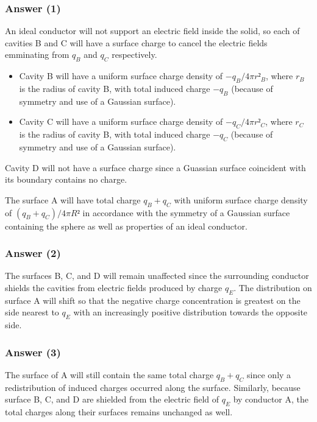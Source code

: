 \subsubsection{Answer (1)}
An ideal conductor will not support an electric field inside the solid, so each
of cavities B and C will have a surface charge to cancel the electric fields
emminating from $q_B$ and $q_C$ respectively.
\begin{itemize}
	\item
		Cavity B will have a uniform surface charge density of $-q_B/4πr²_B$,
		where $r_B$ is the radius of cavity B, with total induced charge $-q_B$
		(because of symmetry and use of a Gaussian surface).
	\item
		Cavity C will have a uniform surface charge density of $-q_C/4πr²_C$,
		where $r_C$ is the radius of cavity B, with total induced charge $-q_C$
		(because of symmetry and use of a Gaussian surface).
\end{itemize}
Cavity D will not have a surface charge since a Guassian surface coincident with
its boundary contains no charge.

The surface A will have total charge $q_B + q_C$ with uniform surface charge
density of $(q_B + q_C) / 4πR²$ in accordance with the symmetry of a Gaussian
surface containing the sphere as well as properties of an ideal conductor.

\subsubsection{Answer (2)}
The surfaces B, C, and D will remain unaffected since the surrounding conductor
shields the cavities from electric fields produced by charge $q_E$. The
distribution on surface A will shift so that the negative charge concentration
is greatest on the side nearest to $q_E$ with an increasingly positive
distribution towards the opposite side.

\subsubsection{Answer (3)}
The surface of A will still contain the same total charge $q_B + q_C$ since only
a redistribution of induced charges occurred along the surface. Similarly,
because surface B, C, and D are shielded from the electric field of $q_E$ by
conductor A, the total charges along their surfaces remains unchanged as well.

